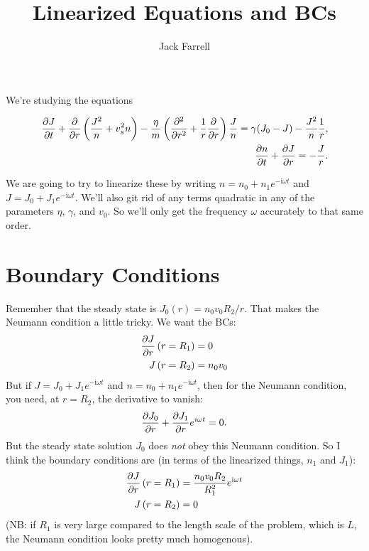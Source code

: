 \documentclass[12pt]{article}
\title{Linearized Equations and BCs}
\author{Jack Farrell}
\begin{document}
	\maketitle
	We're studying the equations
	
	\begin{equation}
	\label{eq:mainEquation}
	\begin{aligned}[c]
	\pdv{J}{t} + \pdv{r}\left(\frac{J^2}{n} + v_s^2 n \right) -\frac{\eta}{m} \left(\pdv[2]{r} + \frac{1}{r}\pdv{r}\right)\frac{J}{n} = \gamma (J_0 - J) - \frac{J^2}{n} \frac{1}{r},  \\
	\pdv{n}{t} + \pdv{J}{r} = -\frac{J}{r}. \\
	\end{aligned}
	\end{equation}
	
	We are going to try to linearize these by writing $n = n_0 + n_1 e^{-\mathrm{i} \omega t}$ and $J = J_0 + J_1 e^{-\mathrm{i} \omega t}$.  We'll also git rid of any terms quadratic in any of the parameters $\eta$, $\gamma$, and $v_0$. So we'll only get the frequency $\omega$ accurately to that same order.
	
	\section{Boundary Conditions}
	Remember that the steady state is $J_0(r) = n_0v_0 R_2 / r$.  That makes the Neumann condition a little tricky.  We want the BCs:
	\begin{equation*}
	\begin{aligned}
	\pdv{J}{r} \left(r = R_1\right) &= 0 \\
	J\left(r = R_2\right) &= n_0 v_0
	\end{aligned}
	\end{equation*}
	But if $J = J_0 + J_1e^{-\mathrm{i} \omega t}$ and $n = n_0 + n_1e^{-\mathrm{i} \omega t}$, then for the Neumann condition, you need, at $r = R_2$, the derivative to vanish:
	\[ \pdv{J_0}{r} + \pdv{J_1}{r}e^{i \omega t} = 0.\]
	But the steady state solution $J_0$ does \textit{not} obey this Neumann condition.  So I think the boundary conditions are (in terms of the linearized  things, $n_1$ and $J_1$):
	\begin{equation}
	\begin{aligned}
	\pdv{J}{r} \left(r = R_1\right) &= \frac{n_0 v_0 R_2}{R_1^2}e^{\mathrm{i} \omega t} \\
	J\left(r = R_2\right) &= 0
	\end{aligned}
	\end{equation}
	(NB: if $R_1$ is very large compared to the length scale of the problem, which is $L$, the Neumann condition looks pretty much homogenous). 
	
\end{document}
